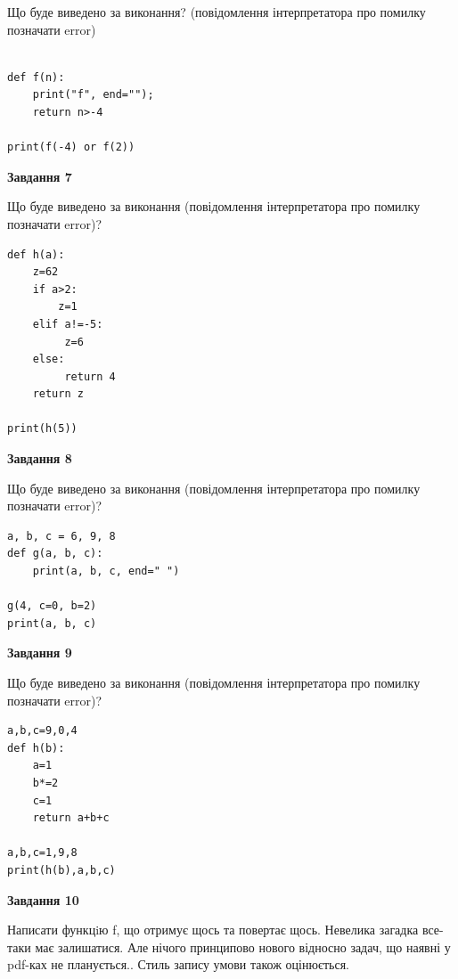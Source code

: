 \documentclass[12pt, ukrainian]{article}
\begin{document}
{\begin {large}
Що буде виведено за виконання? (повідомлення інтерпретатора про помилку позначати error)\par
\begin{verbatim}

def f(n):
    print("f", end="");
    return n>-4

print(f(-4) or f(2))
\end{verbatim}

{\begin {center}\textbf{Завдання 7}\end {center}}

Що буде виведено за виконання (повідомлення інтерпретатора про помилку позначати error)?\par
\begin{verbatim}
def h(a):
    z=62
    if a>2: 
        z=1
    elif a!=-5:
         z=6
    else:
         return 4
    return z

print(h(5))
\end{verbatim}

{\begin {center}\textbf{Завдання 8}\end {center}}

Що буде виведено за виконання (повідомлення інтерпретатора про помилку позначати error)?\par
\begin{verbatim}
a, b, c = 6, 9, 8
def g(a, b, c):
    print(a, b, c, end=" ")

g(4, c=0, b=2)
print(a, b, c)
\end{verbatim}

{\begin {center}\textbf{Завдання 9}\end {center}}

Що буде виведено за виконання (повідомлення інтерпретатора про помилку позначати error)?\par
\begin{verbatim}
a,b,c=9,0,4
def h(b):
    a=1
    b*=2
    c=1
    return a+b+c

a,b,c=1,9,8
print(h(b),a,b,c)
\end{verbatim}

{\begin {center}\textbf{Завдання 10}\end {center}}


Написати функцiю f, що отримує щось та повертає щось. Невелика загадка все-таки має залишатися. Але нічого принципово нового відносно задач, що наявні у pdf-ках не планується.. Стиль запису умови також оцінюється.\par
\end {large}}
\newpage
\end{document}
